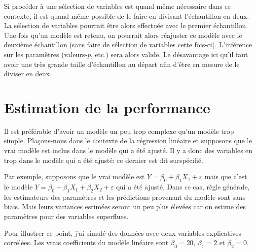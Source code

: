 \documentclass[
  11pt,
  letterpaper,
]{scrbook}
\theoremstyle{definition}
\theoremstyle{remark}
\begin{document}
Si procéder à une sélection de variables est quand même nécessaire dans
ce contexte, il est quand même possible de le faire en divisant
l'échantillon en deux. La sélection de variables pourrait être alors
effectuée avec le premier échantillon. Une fois qu'un modèle est retenu,
on pourrait alors réajuster ce modèle avec le deuxième échantillon (sans
faire de sélection de variables cette fois-ci). L'inférence sur les
paramètres (valeurs-\emph{p}, etc.) sera alors valide. Le désavantage
ici qu'il faut avoir une très grande taille d'échantillon au départ afin
d'être en mesure de le diviser en deux.

\section{Estimation de la
performance}\label{estimation-de-la-performance}

Il est préférable d'avoir un modèle un peu trop complexe qu'un modèle
trop simple. Plaçons-nous dans le contexte de la régression linéaire et
supposons que le vrai modèle est inclus dans le modèle qui a été ajusté.
Il y a donc des variables en trop dans le modèle qui a été ajusté: ce
dernier est dit surspécifié.

Par exemple, supposons que le vrai modèle est
\(Y=\beta_0+\beta_1X_1+\varepsilon\) mais que c'est le modèle
\(Y=\beta_0+\beta_1X_1+\beta_2X_2+\varepsilon\) qui a été ajusté. Dans
ce cas, règle générale, les estimateurs des paramètres et les
prédictions provenant du modèle sont sans biais. Mais leurs variances
estimées seront un peu plus élevées car on estime des paramètres pour
des variables superflues.

Pour illustrer ce point, j'ai simulé des données avec deux variables
explicatives corrélées. Les vrais coefficients du modèle linéaire sont
\(\beta_0 = 20\), \(\beta_1=2\) et \(\beta_2 = 0\).
\end{document}
